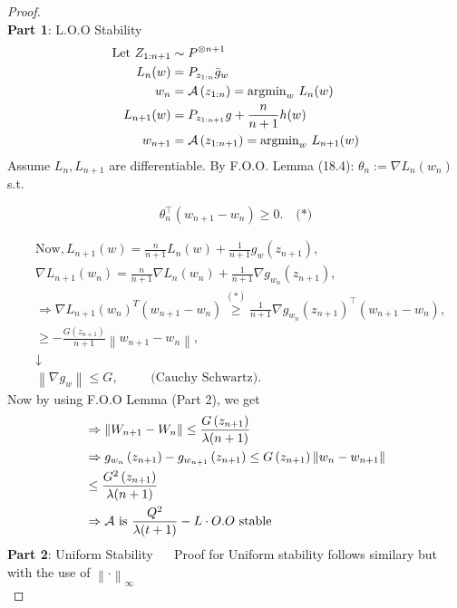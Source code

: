 \documentclass[twoside]{article}
\begin{document}
\begin{proof}
\noindent\mbox{}\\
\noindent\textbf{Part 1}: L.O.O Stability \\

$$
\begin{aligned}
\text{Let } Z_{1:n+1} &\sim P^{\otimes n+1} \\
L_n(w) &= P_{z_{1: n}} \bar{g}_{w} \\
w_{n} &= \mathcal{A} \left(z_{1: n}\right) = \operatorname{argmin}_{w} \, L_n(w)  \\
L_{n+1}(w) &= P_{z_{1: n+1}} g + \frac{n}{n+1} h(w) \\
w_{n+1} &= \mathcal{A} \left(z_{1: n+1}\right) = \operatorname{argmin}_{w} \, L_{n+1}(w)
\end{aligned}
$$
Assume $L_{n}, L_{n+1}$ are differentiable. By F.O.O. Lemma (18.4): $\theta_{n}:=\nabla L_{n}\left(w_{n}\right)$ s.t.

$$
\theta_{n}^{\top}\left(w_{n+1}-w_{n}\right) \geqslant 0 . \quad \text{(*)}
$$

$$
\begin{aligned}
& \text{Now,} \, L_{n+1}(w) = \frac{n}{n+1} L_{n}(w) + \frac{1}{n+1} g_{w}\left(z_{n+1}\right), \\
& \nabla L_{n+1}\left(w_{n}\right) = \frac{n}{n+1} \nabla L_{n}\left(w_{n}\right) + \frac{1}{n+1} \nabla g_{w_{n}}\left(z_{n+1}\right), \\
& \Rightarrow \nabla L_{n+1}\left(w_{n}\right)^{T}\left(w_{n+1} - w_{n}\right) \stackrel{(*)}{\geqslant} \frac{1}{n+1} \nabla g_{w_{n}}\left(z_{n+1}\right)^{\top}\left(w_{n+1} - w_{n}\right), \\
& \geqslant -\frac{G\left(z_{n+1}\right)}{n+1}\left\|w_{n+1} - w_{n}\right\|, \\
& \downarrow \\
& \left\|\nabla g_{w}\right\| \leqslant G, \, \hspace{1cm}\text{(Cauchy Schwartz)}.
\end{aligned}
$$
Now by using F.O.O Lemma (Part 2), we get
$$
\begin{aligned}
& \Rightarrow\left\|W_{n+1}-W_{n}\right\| \leq \frac{G\left(z_{n+1}\right)}{\lambda(n+1)} \\
& \Rightarrow g_{w_{n}}\left(z_{n+1}\right)-g_{w_{n+1}}\left(z_{n+1}\right) \leq G\left(z_{n+1}\right)\left\|w_{n}-w_{n+1}\right\| \\
& \leq \frac{G^{2}\left(z_{n+1}\right)}{\lambda(n+1)} \\
& \Rightarrow \mathcal{A} \text { is } \frac{Q^{2}}{\lambda(t+1)}-L \cdot O.O \text { stable }
\end{aligned}
$$
\textbf{Part 2}: Uniform Stability $\quad$ Proof for Uniform stability follows similary but with the use of $\left\|\cdot \right\|_\infty$ \\



\end{proof}
\end{document}
